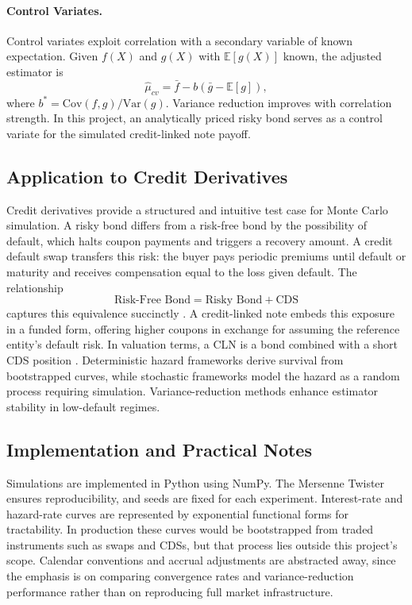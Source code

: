 \paragraph{Control Variates.}
Control variates exploit correlation with a secondary variable of known expectation. Given $f(X)$ and $g(X)$ with $\mathbb{E}[g(X)]$ known, the adjusted estimator is
\begin{equation}
    \hat{\mu}_{cv} = \bar{f} - b(\bar{g} - \mathbb{E}[g]),
\end{equation}
where $b^{*} = \mathrm{Cov}(f,g) / \mathrm{Var}(g)$. Variance reduction improves with correlation strength. In this project, an analytically priced risky bond serves as a control variate for the simulated credit-linked note payoff.

\subsection{Application to Credit Derivatives}

Credit derivatives provide a structured and intuitive test case for Monte Carlo simulation. A risky bond differs from a risk-free bond by the possibility of default, which halts coupon payments and triggers a recovery amount. A credit default swap transfers this risk: the buyer pays periodic premiums until default or maturity and receives compensation equal to the loss given default. The relationship
\[\text{Risk-Free Bond} = \text{Risky Bond} + \text{CDS}\]
captures this equivalence succinctly \citep{schonbucher2003}. A credit-linked note embeds this exposure in a funded form, offering higher coupons in exchange for assuming the reference entity’s default risk. In valuation terms, a CLN is a bond combined with a short CDS position \citep{okaneTurnbull2003}. Deterministic hazard frameworks derive survival from bootstrapped curves, while stochastic frameworks model the hazard as a random process requiring simulation. Variance-reduction methods enhance estimator stability in low-default regimes.

\subsection{Implementation and Practical Notes}

Simulations are implemented in Python using NumPy. The Mersenne Twister ensures reproducibility, and seeds are fixed for each experiment. Interest-rate and hazard-rate curves are represented by exponential functional forms for tractability. In production these curves would be bootstrapped from traded instruments such as swaps and CDSs, but that process lies outside this project’s scope. Calendar conventions and accrual adjustments are abstracted away, since the emphasis is on comparing convergence rates and variance-reduction performance rather than on reproducing full market infrastructure.

